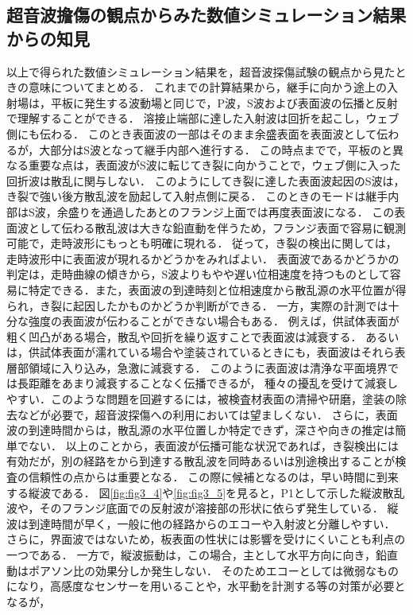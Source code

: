 \subsection{超音波擔傷の観点からみた数値シミュレーション結果からの知見}
以上で得られた数値シミュレーション結果を，超音波探傷試験の観点から見たときの意味についてまとめる．
これまでの計算結果から，継手に向かう途上の入射場は，平板に発生する波動場と同じで，P波，S波および表面波の伝播と反射で理解することができる．
溶接止端部に達した入射波は回折を起こし，ウェブ側にも伝わる．
このとき表面波の一部はそのまま余盛表面を表面波として伝わるが，大部分はS波となって継手内部へ進行する．
この時点までで，平板のと異なる重要な点は，表面波がS波に転じてき裂に向かうことで，ウェブ側に入った回折波は散乱に関与しない．
このようにしてき裂に達した表面波起因のS波は，き裂で強い後方散乱波を励起して入射点側に戻る．
このときのモードは継手内部はS波，余盛りを通過したあとのフランジ上面では再度表面波になる．
この表面波として伝わる散乱波は大きな鉛直動を伴うため，フランジ表面で容易に観測可能で，走時波形にもっとも明確に現れる．
従って，き裂の検出に関しては，走時波形中に表面波が現れるかどうかをみればよい．
表面波であるかどうかの判定は，走時曲線の傾きから，S波よりもやや遅い位相速度を持つものとして容易に特定できる．また，表面波の到達時刻と位相速度から散乱源の水平位置が得られ，き裂に起因したかものかどうか判断ができる．
一方，実際の計測では十分な強度の表面波が伝わることができない場合もある．
例えば，供試体表面が粗く凹凸がある場合，散乱や回折を繰り返すことで表面波は減衰する．
あるいは，供試体表面が濡れている場合や塗装されているときにも，表面波はそれら表層部領域に入り込み，急激に減衰する．
このように表面波は清浄な平面境界では長距離をあまり減衰することなく伝播できるが，
種々の擾乱を受けて減衰しやすい．このような問題を回避するには，被検査材表面の清掃や研磨，塗装の除去などが必要で，超音波探傷への利用においては望ましくない．
さらに，表面波の到達時間からは，散乱源の水平位置しか特定できず，深さや向きの推定は簡単でない．
以上のことから，表面波が伝播可能な状況であれば，き裂検出には有効だが，別の経路をから到達する散乱波を同時あるいは別途検出することが検査の信頼性の点からは重要となる．
この際に候補となるのは，早い時間に到来する縦波である．
図\ref{fig:fig3_4}や\ref{fig:fig3_5}を見ると，P1として示した縦波散乱波や，そのフランジ底面での反射波が溶接部の形状に依らず発生している．
縦波は到達時間が早く，一般に他の経路からのエコーや入射波と分離しやすい．
さらに，界面波ではないため，板表面の性状には影響を受けにくいことも利点の一つである．
一方で，縦波振動は，この場合，主として水平方向に向き，鉛直動はポアソン比の効果分しか発生しない．
そのためエコーとしては微弱なものになり，高感度なセンサーを用いることや，水平動を計測する等の対策が必要となるが，

